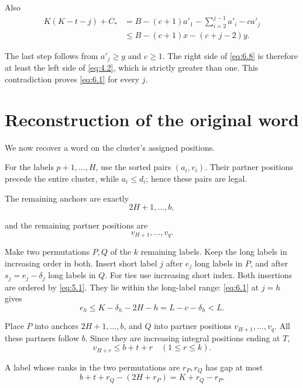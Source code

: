 \documentclass[11pt,a4paper]{article}
\begin{document}
Also
\begin{equation}
\begin{aligned}
K(K-t-j)+C_*
&=B-(c+1)a'_1-\sum_{i=2}^{j-1}a'_i-ca'_j\\
&\le B-(c+1)x-(c+j-2)y.
\end{aligned}
\tag{6.9}
\label{eq:6.9}
\end{equation}

The last step follows from \(a'_j\ge y\) and \(c\ge1\). The right side of \eqref{eq:6.8} is therefore at least the left side of \eqref{eq:4.2}, which is strictly greater than one. This contradiction proves \eqref{eq:6.1} for every \(j\).

\hypertarget{reconstruction-of-the-original-word}{%
\section{Reconstruction of the original word}\label{reconstruction-of-the-original-word}}

We now recover a word on the cluster's assigned positions.

For the labels \(p+1,\ldots,H\), use the sorted pairs \((a_i,v_i)\). Their partner positions precede the entire cluster, while \(a_i\le d_i\); hence these pairs are legal.

The remaining anchors are exactly
\[
2H+1,\ldots,b,
\]

and the remaining partner positions are
\[
v_{H+1},\ldots,v_q.
\]

Make two permutations \(P,Q\) of the \(k\) remaining labels. Keep the long labels in increasing order in both. Insert short label \(j\) after \(e_j\) long labels in \(P\), and after \(s_j=e_j-\delta_j\) long labels in \(Q\). For ties use increasing short index. Both insertions are ordered by \eqref{eq:5.1}. They lie within the long-label range: \eqref{eq:6.1} at \(j=h\) gives
\[
e_h\le K-\delta_h-2H-h=L-c-\delta_h<L.
\]

Place \(P\) into anchors \(2H+1,\ldots,b\), and \(Q\) into partner positions \(v_{H+1},\ldots,v_q\). All these partners follow \(b\). Since they are increasing integral positions ending at \(T\),
\begin{equation}
v_{H+r}\le b+t+r\quad(1\le r\le k).
\tag{7.1}
\label{eq:7.1}
\end{equation}

A label whose ranks in the two permutations are \(r_P,r_Q\) has gap at most
\begin{equation}
b+t+r_Q-(2H+r_P)=K+r_Q-r_P.
\tag{7.2}
\label{eq:7.2}
\end{equation}
\end{document}
